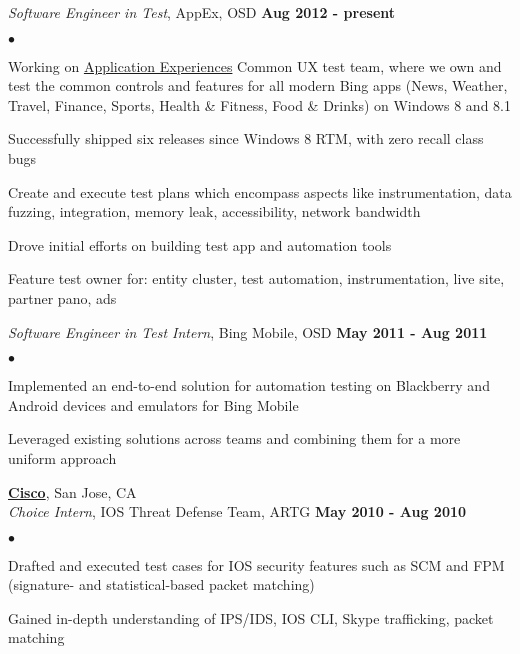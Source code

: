 \documentclass[margin,line]{res}
\newenvironment{list2}
  {\vspace{-4mm}
   \begin{list}{$\bullet$}{
     \setlength{\itemsep}{0in}
     \setlength{\parsep}{0in} \setlength{\parskip}{0in}
     \setlength{\topsep}{0in} \setlength{\partopsep}{0in}
     \setlength{\leftmargin}{0.18in}}}
  {\end{list}}
\begin{document}
\begin{resume}
{\em Software Engineer in Test}, AppEx, OSD                       \hfill {\bf Aug 2012 - present} \\
\begin{list2}
\item Working on \href{http://www.zdnet.com/microsofts-latest-search-share-attack-plan-focus-on-mobile-apps-7000008908/}{Application Experiences}
  Common UX test team, where we own and test the common controls and features for all modern Bing apps
  (News, Weather, Travel, Finance, Sports, Health \& Fitness, Food \& Drinks) on Windows 8 and 8.1
\item Successfully shipped six releases since Windows 8 RTM, with zero recall class bugs
\item Create and execute test plans which encompass aspects like instrumentation, data fuzzing, integration,
  memory leak, accessibility, network bandwidth
\item Drove initial efforts on building test app and automation tools
\item Feature test owner for: entity cluster, test automation, instrumentation, live site, partner pano, ads
\end{list2}

{\em Software Engineer in Test Intern}, Bing Mobile, OSD          \hfill {\bf May 2011 - Aug 2011} \\
\begin{list2}
\item Implemented an end-to-end solution for automation testing on Blackberry and Android devices 
  and emulators for Bing Mobile
\item Leveraged existing solutions across teams and combining them for a more uniform approach
\end{list2}

{\bf \href{http://cisco.com}{Cisco}}, San Jose, CA \\
{\em Choice Intern}, IOS Threat Defense Team, ARTG                \hfill {\bf May 2010 - Aug 2010}\\
\begin{list2}
\item Drafted and executed test cases for IOS security features such as SCM and FPM
  (signature- and statistical-based packet matching)
\item Gained in-depth understanding of IPS/IDS, IOS CLI, Skype trafficking, packet matching
\end{list2}


\end{resume}
\end{document}

